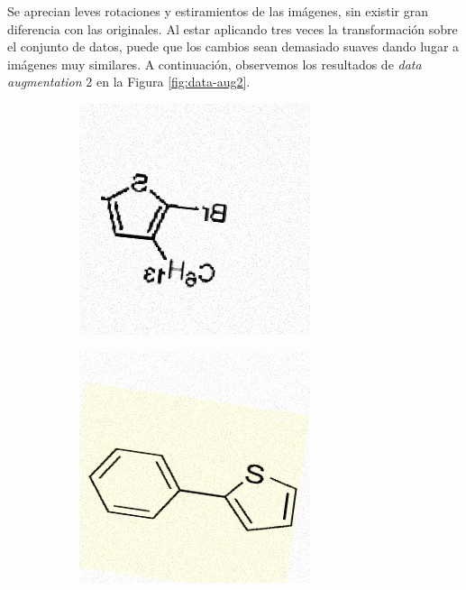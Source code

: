 Se aprecian leves rotaciones y estiramientos de las imágenes, sin existir gran diferencia con las originales. Al estar aplicando tres veces la transformación sobre el conjunto de datos, puede que los cambios sean demasiado suaves dando lugar a imágenes muy similares. A continuación, observemos los resultados de \textit{data augmentation} 2 en la Figura \ref{fig:data-aug2}.

\begin{figure}[H]
\centering
    \begin{subfigure}{.23\textwidth}
        \centering
        \includegraphics[width=1\linewidth]{imagenes/aug2/169.jpg}
    \end{subfigure}%
    \begin{subfigure}{.23\textwidth}
        \centering
        \includegraphics[width=1\linewidth]{imagenes/aug2/188.jpg}

\end{subfigure}
\end{figure}
